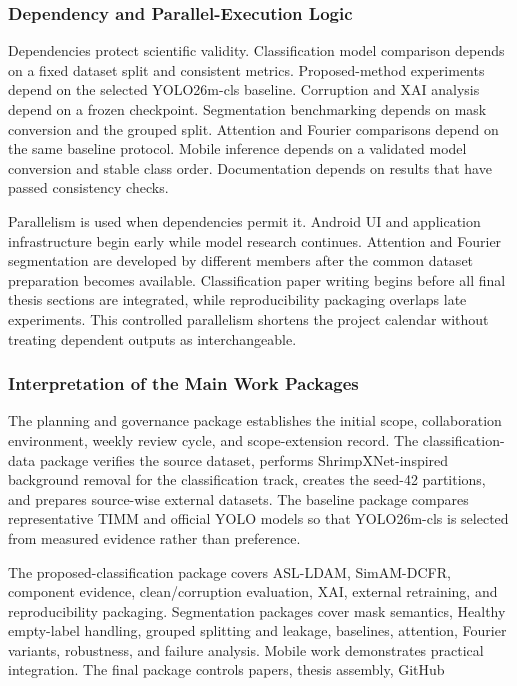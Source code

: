 \documentclass[12pt,a4paper]{report}
\newenvironment{revisionblock}{\begin{snugshade}\noindent}{\end{snugshade}}
\begin{document}
\subsubsection{Dependency and Parallel-Execution Logic}
Dependencies protect scientific validity. Classification model comparison depends on a fixed dataset split and consistent metrics. Proposed-method experiments depend on the selected YOLO26m-cls baseline. Corruption and XAI analysis depend on a frozen checkpoint. Segmentation benchmarking depends on mask conversion and the grouped split. Attention and Fourier comparisons depend on the same baseline protocol. Mobile inference depends on a validated model conversion and stable class order. Documentation depends on results that have passed consistency checks.\par
Parallelism is used when dependencies permit it. Android UI and application infrastructure begin early while model research continues. Attention and Fourier segmentation are developed by different members after the common dataset preparation becomes available. Classification paper writing begins before all final thesis sections are integrated, while reproducibility packaging overlaps late experiments. This controlled parallelism shortens the project calendar without treating dependent outputs as interchangeable.\par
\subsubsection{Interpretation of the Main Work Packages}
The planning and governance package establishes the initial scope, collaboration environment, weekly review cycle, and scope-extension record. The classification-data package verifies the source dataset, performs ShrimpXNet-inspired background removal for the classification track, creates the seed-42 partitions, and prepares source-wise external datasets. The baseline package compares representative TIMM and official YOLO models so that YOLO26m-cls is selected from measured evidence rather than preference.\par
\begin{revisionblock}
The proposed-classification package covers ASL-LDAM, SimAM-DCFR, component evidence, clean/corruption evaluation, XAI, external retraining, and reproducibility packaging. Segmentation packages cover mask semantics, Healthy empty-label handling, grouped splitting and leakage, baselines, attention, Fourier variants, robustness, and failure analysis. Mobile work demonstrates practical integration. The final package controls papers, thesis assembly, GitHub
\end{revisionblock}
\end{document}
